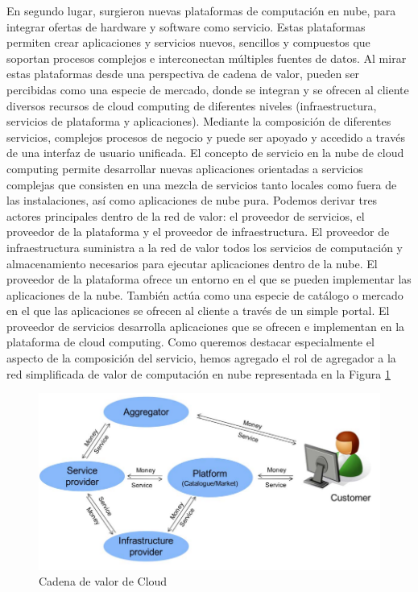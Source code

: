 \documentclass[a4paper, 12pt]{report}
\begin{document}
\begin{enumerate}[label=\alph*)]
En segundo lugar, surgieron nuevas plataformas de computación en nube, para integrar ofertas de hardware y software como servicio. Estas plataformas permiten crear aplicaciones y servicios nuevos, sencillos y compuestos que soportan procesos complejos e interconectan múltiples fuentes de datos. 
Al mirar estas plataformas desde una perspectiva de cadena de valor, pueden ser percibidas como una especie de mercado, donde se integran y se ofrecen al cliente diversos recursos de cloud computing de diferentes niveles (infraestructura, servicios de plataforma y aplicaciones). Mediante la composición de diferentes servicios, complejos procesos de negocio y puede ser apoyado y accedido a través de una interfaz de usuario unificada. El concepto de servicio en la nube de cloud computing permite desarrollar nuevas aplicaciones orientadas a servicios complejas que consisten en una mezcla de servicios tanto locales como fuera de las instalaciones, así como aplicaciones de nube pura. 
Podemos derivar tres actores principales dentro de la red de valor: el proveedor de servicios, el proveedor de la plataforma y el proveedor de infraestructura. El proveedor de infraestructura suministra a la red de valor todos los servicios de computación y almacenamiento necesarios para ejecutar aplicaciones dentro de la nube.
El proveedor de la plataforma ofrece un entorno en el que se pueden implementar las aplicaciones de la nube. También actúa como una especie de catálogo o mercado en el que las aplicaciones se ofrecen al cliente a través de un simple portal. El proveedor de servicios desarrolla aplicaciones que se ofrecen e implementan en la plataforma de cloud computing. Como queremos destacar especialmente el aspecto de la composición del servicio, hemos agregado el rol de agregador a la red simplificada de valor de computación en nube representada en la Figura \ref{fig:cadenaCloud}
		
\begin{figure}[ht]
	\begin{center}
		\includegraphics[width=1\textwidth]{cadenaCloud}
		\caption{Cadena de valor de Cloud}
		\label{fig:cadenaCloud}
	\end{center}
\end{figure}
	\end{enumerate}
\end{document}
